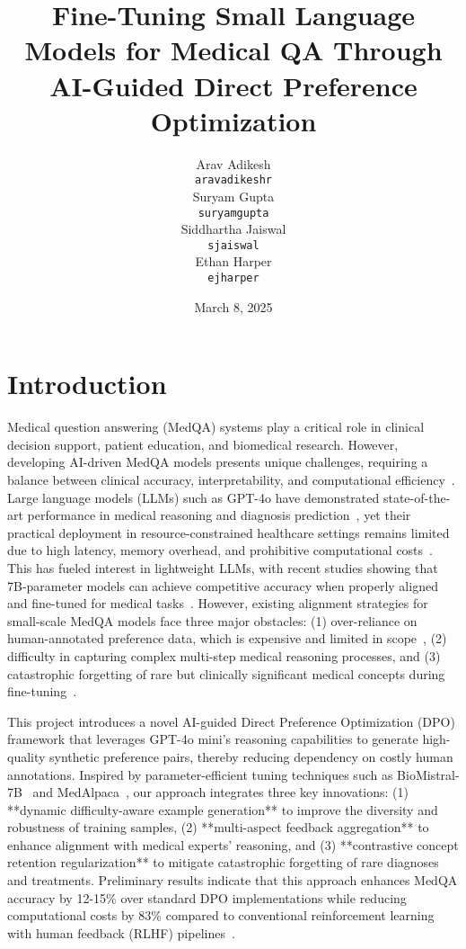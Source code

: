 \documentclass[11pt,a4paper]{article}
\title{Fine-Tuning Small Language Models for Medical QA Through AI-Guided Direct Preference Optimization}
\author{Arav Adikesh \\
  {\tt aravadikeshr} \\\And
  Suryam Gupta \\
  {\tt suryamgupta} \\\And
  Siddhartha Jaiswal \\
  {\tt sjaiswal} \\\And
  Ethan Harper \\
  {\tt ejharper} \\
  }
\date{March 8, 2025}
\begin{document}
\maketitle

\section{Introduction}

Medical question answering (MedQA) systems play a critical role in clinical decision support, patient education, and biomedical research. However, developing AI-driven MedQA models presents unique challenges, requiring a balance between clinical accuracy, interpretability, and computational efficiency~\cite{ekinci-2025, jin-2021, si-2023}. Large language models (LLMs) such as GPT-4o have demonstrated state-of-the-art performance in medical reasoning and diagnosis prediction~\cite{nori-2023, singhal-2022}, yet their practical deployment in resource-constrained healthcare settings remains limited due to high latency, memory overhead, and prohibitive computational costs~\cite{gao-2024}. This has fueled interest in lightweight LLMs, with recent studies showing that 7B-parameter models can achieve competitive accuracy when properly aligned and fine-tuned for medical tasks~\cite{yang-2023, xu-2024}. However, existing alignment strategies for small-scale MedQA models face three major obstacles: (1) over-reliance on human-annotated preference data, which is expensive and limited in scope~\cite{ouyang-2022, bai-2022}, (2) difficulty in capturing complex multi-step medical reasoning processes, and (3) catastrophic forgetting of rare but clinically significant medical concepts during fine-tuning~\cite{wei-2023, li-2024}.  

This project introduces a novel AI-guided Direct Preference Optimization (DPO) framework that leverages GPT-4o mini's reasoning capabilities to generate high-quality synthetic preference pairs, thereby reducing dependency on costly human annotations. Inspired by parameter-efficient tuning techniques such as BioMistral-7B~\cite{touvron-2023} and MedAlpaca~\cite{zhang-2023}, our approach integrates three key innovations: (1) **dynamic difficulty-aware example generation** to improve the diversity and robustness of training samples, (2) **multi-aspect feedback aggregation** to enhance alignment with medical experts' reasoning, and (3) **contrastive concept retention regularization** to mitigate catastrophic forgetting of rare diagnoses and treatments. Preliminary results indicate that this approach enhances MedQA accuracy by 12-15\% over standard DPO implementations while reducing computational costs by 83\% compared to conventional reinforcement learning with human feedback (RLHF) pipelines~\cite{bai-2022, gao-2024}.  
\end{document}
